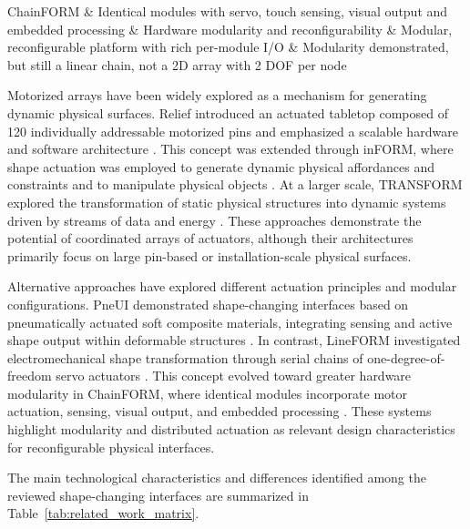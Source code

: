 \documentclass[lettersize,journal]{IEEEtran}
\begin{document}
\begin{table}[!t]
\begin{tabularx}{\textwidth}
			ChainFORM \cite{nakagaki2016chainform} &
			Identical modules with servo, touch sensing, visual output and embedded processing &
			Hardware modularity and reconfigurability &
			Modular, reconfigurable platform with rich per-module I/O &
			Modularity demonstrated, but still a linear chain, not a 2D array with 2 DOF per node \\
			
			\bottomrule
			
		\end{tabularx}
	\end{table}
	
	Motorized arrays have been widely explored as a mechanism for generating
	dynamic physical surfaces. Relief introduced an actuated tabletop composed of
	120 individually addressable motorized pins and emphasized a scalable hardware
	and software architecture \cite{leithinger2010relief}. This concept was
	extended through inFORM, where shape actuation was employed to generate dynamic
	physical affordances and constraints and to manipulate physical objects
	\cite{follmer2013inform}. At a larger scale, TRANSFORM explored the
	transformation of static physical structures into dynamic systems driven by
	streams of data and energy \cite{ishii2015transform}. These approaches
	demonstrate the potential of coordinated arrays of actuators, although their
	architectures primarily focus on large pin-based or installation-scale physical
	surfaces.
	
	Alternative approaches have explored different actuation principles and
	modular configurations. PneUI demonstrated shape-changing interfaces based on
	pneumatically actuated soft composite materials, integrating sensing and active
	shape output within deformable structures \cite{yao2013pneui}. In contrast,
	LineFORM investigated electromechanical shape transformation through serial
	chains of one-degree-of-freedom servo actuators
	\cite{nakagaki2015lineform}. This concept evolved toward greater hardware
	modularity in ChainFORM, where identical modules incorporate motor actuation,
	sensing, visual output, and embedded processing
	\cite{nakagaki2016chainform}. These systems highlight modularity and
	distributed actuation as relevant design characteristics for reconfigurable
	physical interfaces.
	
	The main technological characteristics and differences identified among the
	reviewed shape-changing interfaces are summarized in
	Table~\ref{tab:related_work_matrix}.
	
\end{document}
